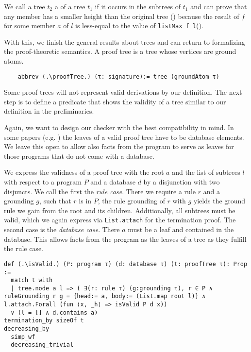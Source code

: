 We call a tree $t_2$ a \member of a tree $t_1$ if it occurs in the subtrees of $t_1$ and can prove that any member has a smaller height than the original tree (\heightOfMemberIsSmaller) because the result of $f$ for some member $a$ of $l$ is less-equal to the value of \lstinline|listMax f l|(\listMaxlefmember).

With this, we finish the general results about trees and can return to formalizing the proof-theoretic semantics. A proof tree is a tree whose vertices are ground atoms.

\begin{lstlisting}
    abbrev (.\proofTree.) (τ: signature):= tree (groundAtom τ)
\end{lstlisting}

Some proof trees will not represent valid derivations by our definition. The next step is to define a predicate that shows the validity of a tree similar to our definition in the preliminaries.

Again, we want to design our checker with the best compatibility in mind. In some papers (e.g. \cite{ComplexityProvDatalog}) the leaves of a valid proof tree have to be database elements. We leave this open to allow also facts from the program to serve as leaves for those programs that do not come with a database.

We express the validness of a proof tree with the root $a$ and the list of subtrees $l$ with respect to a program $P$ and a database $d$ by a disjunction with two disjuncts. We call the first the \textit{rule case}. There we require a rule $r$ and a grounding $g$, such that $r$ is in $P$, the rule grounding of $r$ with $g$ yields the ground rule we gain from the root and its children. Additionally, all subtrees must be valid, which we again express via \lstinline|List.attach| for the termination proof. 
The second case is the \textit{database case}. There $a$ must be a leaf and contained in the database.
This allows facts from the program as the leaves of a tree as they fulfill the rule case.

\begin{lstlisting}
def (.\isValid.) (P: program τ) (d: database τ) (t: proofTree τ): Prop :=
  match t with
  | tree.node a l => ( ∃(r: rule τ) (g:grounding τ), r ∈ P ∧ ruleGrounding r g = {head:= a, body:= (List.map root l)} ∧ l.attach.Forall (fun ⟨x, _h⟩ => isValid P d x)) 
  ∨ (l = [] ∧ d.contains a)
termination_by sizeOf t
decreasing_by
  simp_wf
  decreasing_trivial
\end{lstlisting}

